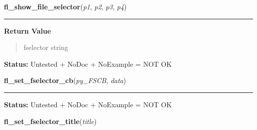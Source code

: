 \hspace{.8\funcindent}\begin{boxedminipage}{\funcwidth}

    \raggedright \textbf{fl\_show\_file\_selector}(\textit{p1}, \textit{p2}, \textit{p3}, \textit{p4})

    \vspace{-1.5ex}

    \rule{\textwidth}{0.5\fboxrule}
\setlength{\parskip}{2ex}
\setlength{\parskip}{1ex}
      \textbf{Return Value}
    \vspace{-1ex}

      \begin{quote}
      fselector string

      \end{quote}

\textbf{Status:} Untested + NoDoc + NoExample = NOT OK



    \end{boxedminipage}

    \label{xformslib:library:fl_set_fselector_callback}

    \vspace{0.5ex}

\hspace{.8\funcindent}\begin{boxedminipage}{\funcwidth}

    \raggedright \textbf{fl\_set\_fselector\_cb}(\textit{py\_FSCB}, \textit{data})

    \vspace{-1.5ex}

    \rule{\textwidth}{0.5\fboxrule}
\setlength{\parskip}{2ex}
\setlength{\parskip}{1ex}
\textbf{Status:} Untested + NoDoc + NoExample = NOT OK



    \end{boxedminipage}

    \label{xformslib:library:fl_set_fselector_title}

    \vspace{0.5ex}

\hspace{.8\funcindent}\begin{boxedminipage}{\funcwidth}

    \raggedright \textbf{fl\_set\_fselector\_title}(\textit{title})

\setlength{\parskip}{2ex}
\setlength{\parskip}{1ex}
    \end{boxedminipage}


